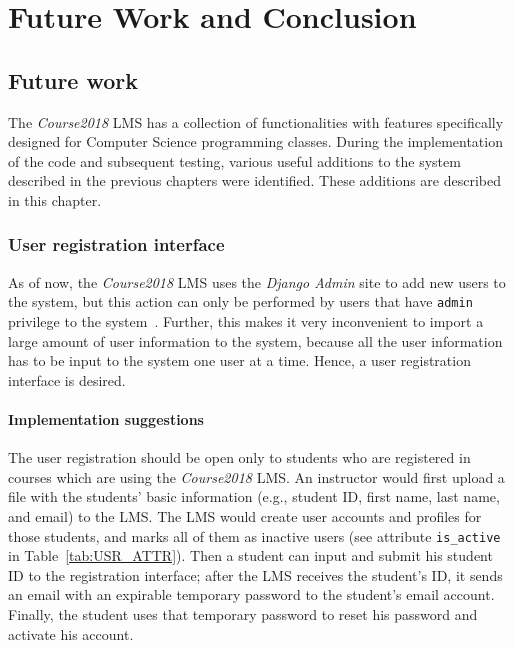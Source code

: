 

\chapter{Future Work and Conclusion}
\label{chap:FUTURE}

\section{Future work}
The \emph{Course2018} LMS has a collection of functionalities 
with features specifically designed for Computer Science programming
classes.
During the implementation of the code and subsequent testing,
various useful additions to the system
described in the previous chapters were identified.
These additions are described in this chapter.

\subsection{User registration interface}
As of now, the \emph{Course2018} LMS uses the \emph{Django Admin} site to
add new users to the system, but this action can only be performed by users that
have \texttt{admin} privilege to the system~\cite{AdjangoAdmin}.
Further, this
makes it very inconvenient to import a large amount of user information to
the system, because all the user information has to be input to the system one
user at a time. Hence, a user registration interface is desired.

\subsubsection{Implementation suggestions}
The user registration should be open only to students
who are registered in courses which are using the \emph{Course2018} LMS\null.
An instructor would first upload a file with the students' basic information
(e.g., student ID, first name, last name, and email) to the LMS\null. The LMS would
create user accounts and profiles for those students, and marks all of them
as inactive users (see attribute \texttt{is\_active} in
Table~\ref{tab:USR_ATTR}).
Then a student can input and submit his student ID to the registration
interface; after the LMS receives the student's ID,
it sends an email with an expirable temporary password to the student's
email account.
Finally, the student uses that temporary password to reset his password and
activate his account.


